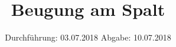 
\usepackage{longtable}
\usepackage{wrapfig}
\usepackage{ dsfont }
\subject{VERSUCH 406}
\title{Beugung am Spalt}
\date{%
  \hspace{-2.5em}
  Durchführung: 03.07.2018
  \hspace{4em}
  Abgabe: 10.07.2018
}


  \setlength{\parindent}{0em}
  \maketitle
  \thispagestyle{empty}
  \newpage
  \tableofcontents
  \newpage





\printbibliography{}




